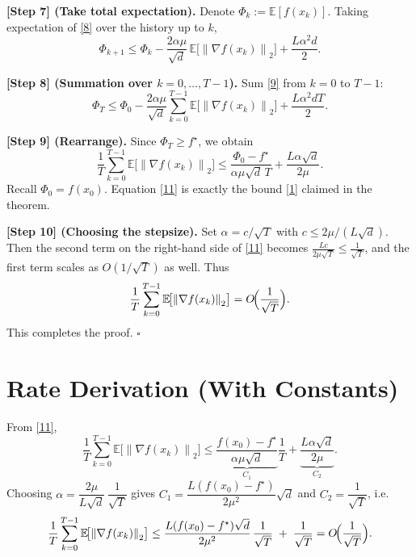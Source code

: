 \documentclass{article}
\newcommand{\E}{\mathbb{E}}
\newcommand{\norm}[1]{\left\lVert#1\right\rVert}
\begin{document}
\noindent\textbf{[Step 7] (Take total expectation).}
Denote $\Phi_k:=\E[f(x_k)]$.  Taking expectation of \eqref{8} over the history up to $k$,
\[
\Phi_{k+1}\le \Phi_k-\frac{2\alpha\mu}{\sqrt d}\,\E\!\bigl[\norm{\nabla f(x_k)}_2\bigr]
+\frac{L\alpha^2 d}{2}.
\tag{9}
\]

\noindent\textbf{[Step 8] (Summation over $k=0,\dots,T-1$).}
Sum \eqref{9} from $k=0$ to $T-1$:
\[
\Phi_T \le \Phi_0
-\frac{2\alpha\mu}{\sqrt d}\sum_{k=0}^{T-1}\E\!\bigl[\norm{\nabla f(x_k)}_2\bigr]
+\frac{L\alpha^2 d T}{2}.
\tag{10}
\]

\noindent\textbf{[Step 9] (Rearrange).}
Since $\Phi_T\ge f^\star$, we obtain
\[
\frac{1}{T}\sum_{k=0}^{T-1}\E\!\bigl[\norm{\nabla f(x_k)}_2\bigr]
\le
\frac{\Phi_0-f^\star}{\alpha\mu\sqrt d\,T}
+\frac{L\alpha\sqrt d}{2\mu}.
\tag{11}
\]
Recall $\Phi_0=f(x_0)$.  Equation \eqref{11} is exactly the bound \eqref{1} claimed in the theorem.

\noindent\textbf{[Step 10] (Choosing the stepsize).}
Set $\alpha = c/\sqrt T$ with $c\le 2\mu/(L\sqrt d)$.
Then the second term on the right-hand side of \eqref{11} becomes
$\frac{Lc}{2\mu\sqrt T}\le \frac{1}{\sqrt T}$,
and the first term scales as $O(1/\sqrt T)$ as well.
Thus
\[
\frac{1}{T}\sum_{k=0}^{T-1}\E\!\bigl[\norm{\nabla f(x_k)}_2\bigr]
= O\!\Bigl(\frac{1}{\sqrt T}\Bigr).
\]
This completes the proof. \hfill $\square$

\section*{Rate Derivation (With Constants)}
From \eqref{11},
\[
\boxed{
\frac{1}{T}\sum_{k=0}^{T-1}\E\!\bigl[\norm{\nabla f(x_k)}_2\bigr]
\le
\underbrace{\frac{f(x_0)-f^\star}{\alpha\mu\sqrt d}}_{C_1}
\frac{1}{T}
+
\underbrace{\frac{L\alpha\sqrt d}{2\mu}}_{C_2}.
}
\]
Choosing $\alpha = \dfrac{2\mu}{L\sqrt d}\,\dfrac{1}{\sqrt T}$ gives $C_1 = \dfrac{L(f(x_0)-f^\star)}{2\mu^2}\sqrt d$ and $C_2 = \dfrac{1}{\sqrt T}$, i.e.
\[
\frac{1}{T}\sum_{k=0}^{T-1}\E\!\bigl[\norm{\nabla f(x_k)}_2\bigr]
\le
\frac{L(f(x_0)-f^\star)\sqrt d}{2\mu^2}\,\frac{1}{\sqrt T}
\;+\;
\frac{1}{\sqrt T}
=
O\!\Bigl(\frac{1}{\sqrt T}\Bigr).
\]
\end{document}
